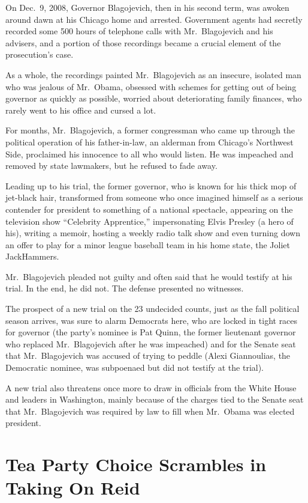 ﻿\documentclass[12pt]{article}
\begin{document}
On Dec.~9, 2008, Governor Blagojevich, then in his second term, was awoken around dawn at his
Chicago home and arrested. Government agents had secretly recorded some 500 hours of telephone calls
with Mr.~Blagojevich and his advisers, and a portion of those recordings became a crucial element of
the prosecution's case.

As a whole, the recordings painted Mr.~Blagojevich as an insecure, isolated man who was jealous of
Mr.~Obama, obsessed with schemes for getting out of being governor as quickly as possible, worried
about deteriorating family finances, who rarely went to his office and cursed a lot.

For months, Mr.~Blagojevich, a former congressman who came up through the political operation of his
father-in-law, an alderman from Chicago's Northwest Side, proclaimed his innocence to all who would
listen. He was impeached and removed by state lawmakers, but he refused to fade away.

Leading up to his trial, the former governor, who is known for his thick mop of jet-black hair,
transformed from someone who once imagined himself as a serious contender for president to something
of a national spectacle, appearing on the television show ``Celebrity Apprentice,'' impersonating
Elvis Presley (a hero of his), writing a memoir, hosting a weekly radio talk show and even turning
down an offer to play for a minor league baseball team in his home state, the Joliet JackHammers.

Mr.~Blagojevich pleaded not guilty and often said that he would testify at his trial. In the end, he
did not. The defense presented no witnesses.

The prospect of a new trial on the 23 undecided counts, just as the fall political season arrives,
was sure to alarm Democrats here, who are locked in tight races for governor (the party's nominee is
Pat Quinn, the former lieutenant governor who replaced Mr.~Blagojevich after he was impeached) and
for the Senate seat that Mr.~Blagojevich was accused of trying to peddle (Alexi Giannoulias, the
Democratic nominee, was subpoenaed but did not testify at the trial).

A new trial also threatens once more to draw in officials from the White House and leaders in
Washington, mainly because of the charges tied to the Senate seat that Mr.~Blagojevich was required
by law to fill when Mr.~Obama was elected president.

\section{Tea Party Choice Scrambles in Taking On Reid}
\end{document}
